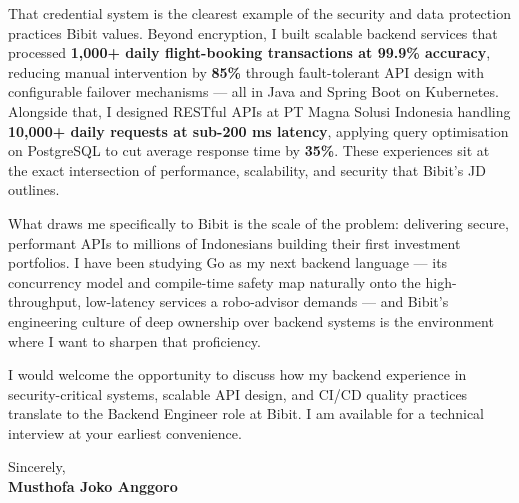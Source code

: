 \documentclass[11pt,a4paper]{article}
\begin{document}
That credential system is the clearest example of the security and data protection practices Bibit values. Beyond encryption, I built scalable backend services that processed \textbf{1,000+ daily flight-booking transactions at 99.9\% accuracy}, reducing manual intervention by \textbf{85\%} through fault-tolerant API design with configurable failover mechanisms — all in Java and Spring Boot on Kubernetes. Alongside that, I designed RESTful APIs at PT Magna Solusi Indonesia handling \textbf{10,000+ daily requests at sub-200 ms latency}, applying query optimisation on PostgreSQL to cut average response time by \textbf{35\%}. These experiences sit at the exact intersection of performance, scalability, and security that Bibit's JD outlines.

What draws me specifically to Bibit is the scale of the problem: delivering secure, performant APIs to millions of Indonesians building their first investment portfolios. I have been studying Go as my next backend language — its concurrency model and compile-time safety map naturally onto the high-throughput, low-latency services a robo-advisor demands — and Bibit's engineering culture of deep ownership over backend systems is the environment where I want to sharpen that proficiency.

I would welcome the opportunity to discuss how my backend experience in security-critical systems, scalable API design, and CI/CD quality practices translate to the Backend Engineer role at Bibit. I am available for a technical interview at your earliest convenience.

\vspace{8pt}

Sincerely, \\[12pt]
\textbf{Musthofa Joko Anggoro}
\end{document}
